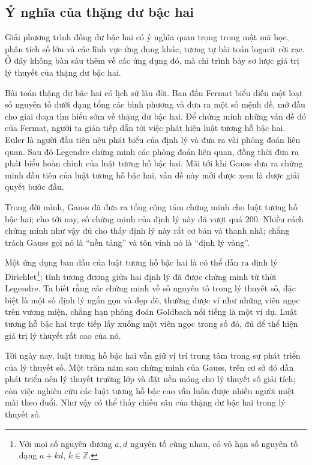 \documentclass[11pt]{article}
\begin{document}
\subsection{Ý nghĩa của thặng dư bậc hai}

Giải phương trình đồng dư bậc hai có ý nghĩa quan trọng trong mật mã học, phân
tích số lớn và các lĩnh vực ứng dụng khác, tương tự bài toán logarit rời rạc.
Ở đây không bàn sâu thêm về các ứng dụng đó, mà chỉ trình bày sơ lược giá trị
lý thuyết của thặng dư bậc hai.

Bài toán thặng dư bậc hai có lịch sử lâu đời. Ban đầu Fermat biểu diễn một
loạt số nguyên tố dưới dạng tổng các bình phương và đưa ra một số mệnh đề, mở
đầu cho giai đoạn tìm hiểu sớm về thặng dư bậc hai. Để chứng minh những vấn
đề đó của Fermat, người ta gián tiếp dẫn tới việc phát hiện luật tương hỗ bậc
hai. Euler là người đầu tiên nêu phát biểu của định lý và đưa ra vài phỏng
đoán liên quan. Sau đó Legendre chứng minh các phỏng đoán liên quan, đồng thời
đưa ra phát biểu hoàn chỉnh của luật tương hỗ bậc hai. Mãi tới khi Gauss đưa
ra chứng minh đầu tiên của luật tương hỗ bậc hai, vấn đề này mới được xem là
được giải quyết bước đầu.

Trong đời mình, Gauss đã đưa ra tổng cộng tám chứng minh cho luật tương hỗ bậc
hai; cho tới nay, số chứng minh của định lý này đã vượt quá 200. Nhiều cách
chứng minh như vậy đủ cho thấy định lý này rất cơ bản và thanh nhã; chẳng
trách Gauss gọi nó là ``nền tảng'' và tôn vinh nó là ``định lý vàng''.

Một ứng dụng ban đầu của luật tương hỗ bậc hai là có thể dẫn ra định lý
Dirichlet\footnote{Với mọi số nguyên dương $a,d$ nguyên tố cùng nhau, có vô
hạn số nguyên tố dạng $a+kd$, $k\in\mathbb Z$.}; tính tương đương giữa hai
định lý đã được chứng minh từ thời Legendre. Ta biết rằng các chứng minh về
số nguyên tố trong lý thuyết số, đặc biệt là một số định lý ngắn gọn và đẹp
đẽ, thường được ví như những viên ngọc trên vương miện, chẳng hạn phỏng đoán
Goldbach nổi tiếng là một ví dụ. Luật tương hỗ bậc hai trực tiếp lấy xuống một
viên ngọc trong số đó, đủ để thể hiện giá trị lý thuyết rất cao của nó.

Tới ngày nay, luật tương hỗ bậc hai vẫn giữ vị trí trung tâm trong sự phát
triển của lý thuyết số. Một trăm năm sau chứng minh của Gauss, trên cơ sở đó
dần phát triển nên lý thuyết trường lớp và đặt nền móng cho lý thuyết số giải
tích; còn việc nghiên cứu các luật tương hỗ bậc cao vẫn luôn được nhiều người
miệt mài theo đuổi. Như vậy có thể thấy chiều sâu của thặng dư bậc hai trong
lý thuyết số.
\end{document}
